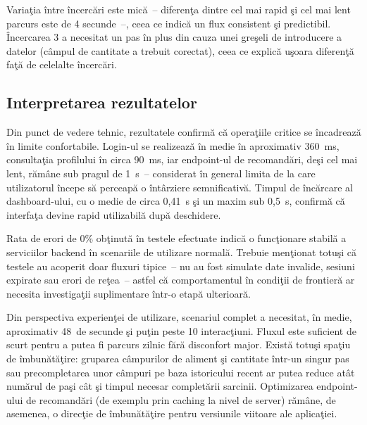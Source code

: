 \documentclass[12pt,a4paper]{article}
\begin{document}
\vspace{6pt}

Varia\c{t}ia \^{i}ntre \^{i}ncerc\u{a}ri este mic\u{a}~-- diferen\c{t}a dintre cel mai rapid \c{s}i cel mai lent parcurs este de 4 secunde~--, ceea ce indic\u{a} un flux consistent \c{s}i predictibil. \^{I}ncercarea 3 a necesitat un pas \^{i}n plus din cauza unei gre\c{s}eli de introducere a datelor (c\^{a}mpul de cantitate a trebuit corectat), ceea ce explic\u{a} u\c{s}oara diferen\c{t}\u{a} fa\c{t}\u{a} de celelalte \^{i}ncerc\u{a}ri.

\subsection*{Interpretarea rezultatelor}

Din punct de vedere tehnic, rezultatele confirm\u{a} c\u{a} opera\c{t}iile critice se \^{i}ncadreaz\u{a} \^{i}n limite confortabile. Login-ul se realizeaz\u{a} \^{i}n medie \^{i}n aproximativ 360~ms, consulta\c{t}ia profilului \^{i}n circa 90~ms, iar endpoint-ul de recomand\u{a}ri, de\c{s}i cel mai lent, r\u{a}m\^{a}ne sub pragul de 1~s~-- considerat \^{i}n general limita de la care utilizatorul \^{i}ncepe s\u{a} perceap\u{a} o \^{i}nt\^{a}rziere semnificativ\u{a}. Timpul de \^{i}nc\u{a}rcare al dashboard-ului, cu o medie de circa 0{,}41~s \c{s}i un maxim sub 0{,}5~s, confirm\u{a} c\u{a} interfa\c{t}a devine rapid utilizabil\u{a} dup\u{a} deschidere.

Rata de erori de 0\% ob\c{t}inut\u{a} \^{i}n testele efectuate indic\u{a} o func\c{t}ionare stabil\u{a} a serviciilor backend \^{i}n scenariile de utilizare normal\u{a}. Trebuie men\c{t}ionat totu\c{s}i c\u{a} testele au acoperit doar fluxuri tipice~-- nu au fost simulate date invalide, sesiuni expirate sau erori de re\c{t}ea~-- astfel c\u{a} comportamentul \^{i}n condi\c{t}ii de frontier\u{a} ar necesita investiga\c{t}ii suplimentare \^{i}ntr-o etap\u{a} ulterioar\u{a}.

Din perspectiva experien\c{t}ei de utilizare, scenariul complet a necesitat, \^{i}n medie, aproximativ 48~de secunde \c{s}i pu\c{t}in peste 10 interac\c{t}iuni. Fluxul este suficient de scurt pentru a putea fi parcurs zilnic f\u{a}r\u{a} disconfort major. Exist\u{a} totu\c{s}i spa\c{t}iu de \^{i}mbun\u{a}t\u{a}\c{t}ire: gruparea c\^{a}mpurilor de aliment \c{s}i cantitate \^{i}ntr-un singur pas sau precompletarea unor c\^{a}mpuri pe baza istoricului recent ar putea reduce at\^{a}t num\u{a}rul de pa\c{s}i c\^{a}t \c{s}i timpul necesar complet\u{a}rii sarcinii. Optimizarea endpoint-ului de recomand\u{a}ri (de exemplu prin caching la nivel de server) r\u{a}m\^{a}ne, de asemenea, o direc\c{t}ie de \^{i}mbun\u{a}t\u{a}\c{t}ire pentru versiunile viitoare ale aplica\c{t}iei.
\end{document}
